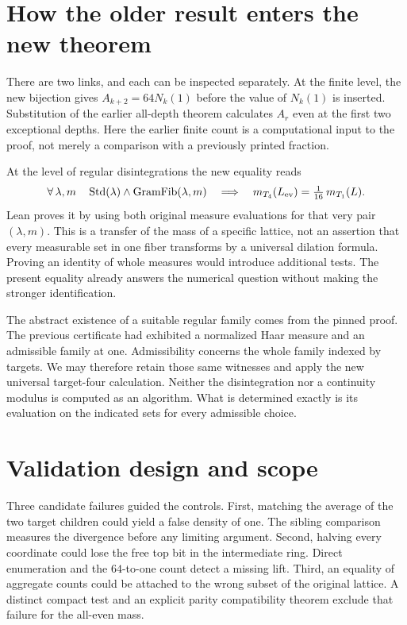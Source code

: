 \documentclass[12pt,letterpaper]{article}
\begin{document}
\section{How the older result enters the new theorem}
There are two links, and each can be inspected separately. At the finite level, the new bijection gives $A_{k+2}=64N_k(1)$ before the value of $N_k(1)$ is inserted. Substitution of the earlier all-depth theorem calculates $A_r$ even at the first two exceptional depths. Here the earlier finite count is a computational input to the proof, not merely a comparison with a previously printed fraction.

At the level of regular disintegrations the new equality reads
\[
 \forall\,\lambda,m\quad
  \operatorname{Std}(\lambda)\wedge\operatorname{GramFib}(\lambda,m)
   \quad\Longrightarrow\quad
       m_{T_4}(L_{\rm ev})=\tfrac1{16}\,m_{T_1}(L).
\]
Lean proves it by using both original measure evaluations for that very pair $(\lambda,m)$. This is a transfer of the mass of a specific lattice, not an assertion that every measurable set in one fiber transforms by a universal dilation formula. Proving an identity of whole measures would introduce additional tests. The present equality already answers the numerical question without making the stronger identification.

The abstract existence of a suitable regular family comes from the pinned proof. The previous certificate had exhibited a normalized Haar measure and an admissible family at one. Admissibility concerns the whole family indexed by targets. We may therefore retain those same witnesses and apply the new universal target-four calculation. Neither the disintegration nor a continuity modulus is computed as an algorithm. What is determined exactly is its evaluation on the indicated sets for every admissible choice.

\section{Validation design and scope}
Three candidate failures guided the controls. First, matching the average of the two target children could yield a false density of one. The sibling comparison measures the divergence before any limiting argument. Second, halving every coordinate could lose the free top bit in the intermediate ring. Direct enumeration and the $64$-to-one count detect a missing lift. Third, an equality of aggregate counts could be attached to the wrong subset of the original lattice. A distinct compact test and an explicit parity compatibility theorem exclude that failure for the all-even mass.
\end{document}

